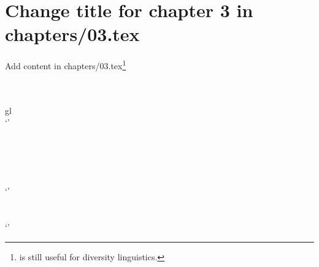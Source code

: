 \chapter{Change title for chapter 3 in chapters/03.tex}
Add content in chapters/03.tex\footnote{\citet{Comrie1981} is still useful for diversity linguistics. }

\ea \label{mehoy}
\langinfo{}{}{\citealt[]{}}\\
\gll \\
gl\\
\glt ‘’
\z

\ea
\\
\ea
\langinfo{}{}{\citealt[]{}}\\
\gll \\
\\
\glt ‘’
\ex
\langinfo{}{}{\citealt[]{}}\\
\gll \\
\\
\glt ‘’
\z
\z
